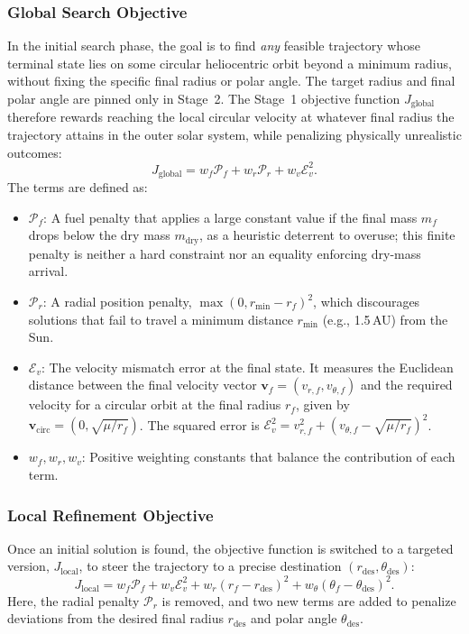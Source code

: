 \documentclass[journal,a4paper]{IEEEtran}
\begin{document}
\subsubsection{Global Search Objective}
In the initial search phase, the goal is to find \emph{any} feasible trajectory whose terminal state lies on some circular heliocentric orbit beyond a minimum radius, without fixing the specific final radius or polar angle. The target radius and final polar angle are pinned only in Stage~2. The Stage~1 objective function $J_\text{global}$ therefore rewards reaching the local circular velocity at whatever final radius the trajectory attains in the outer solar system, while penalizing physically unrealistic outcomes:
\begin{equation}
    J_\text{global} = w_f \mathcal{P}_f + w_r \mathcal{P}_r + w_v \mathcal{E}_v^2.
    \label{eq:obj_global}
\end{equation}
The terms are defined as:
\begin{itemize}
    \item $\mathcal{P}_f$: A fuel penalty that applies a large constant value if the final mass $m_f$ drops below the dry mass $m_\text{dry}$, as a heuristic deterrent to overuse; this finite penalty is neither a hard constraint nor an equality enforcing dry-mass arrival.
    \item $\mathcal{P}_r$: A radial position penalty, $\max(0, r_\text{min} - r_f)^2$, which discourages solutions that fail to travel a minimum distance $r_\text{min}$ (e.g., 1.5\,AU) from the Sun.
    \item $\mathcal{E}_v$: The velocity mismatch error at the final state. It measures the Euclidean distance between the final velocity vector $\mathbf{v}_f=(v_{r,f}, v_{\theta,f})$ and the required velocity for a circular orbit at the final radius $r_f$, given by $\mathbf{v}_\text{circ}=(0, \sqrt{\mu/r_f})$. The squared error is $\mathcal{E}_v^2 = v_{r,f}^2 + (v_{\theta,f} - \sqrt{\mu/r_f})^2$.
    \item $w_f, w_r, w_v$: Positive weighting constants that balance the contribution of each term.
\end{itemize}

\subsubsection{Local Refinement Objective}
Once an initial solution is found, the objective function is switched to a targeted version, $J_\text{local}$, to steer the trajectory to a precise destination $(r_\text{des}, \theta_\text{des})$:\
\begin{equation}
    J_\text{local} = w_f \mathcal{P}_f + w_v \mathcal{E}_v^2 + w_r (r_f - r_\text{des})^2 + w_\theta (\theta_f - \theta_\text{des})^2.
    \label{eq:obj_local}
\end{equation}
Here, the radial penalty $\mathcal{P}_r$ is removed, and two new terms are added to penalize deviations from the desired final radius $r_\text{des}$ and polar angle $\theta_\text{des}$.
\end{document}
